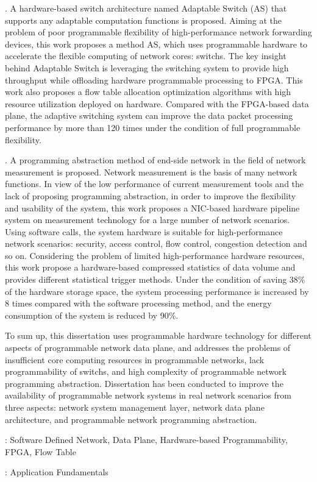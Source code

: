 . A hardware-based switch architecture named Adaptable Switch (AS) that supports any adaptable computation functions is proposed.
Aiming at the problem of poor programmable flexibility of high-performance network forwarding devices, this work proposes a method AS, which uses programmable hardware to accelerate the flexible computing of network cores: switchs.
The key insight behind Adaptable Switch is leveraging the switching system to provide high throughput while offloading hardware programmable processing to FPGA. 
This work also proposes a flow table allocation optimization algorithms with high resource utilization deployed on hardware.
Compared with the FPGA-based data plane, the adaptive switching system can improve the data packet processing performance by more than 120 times under the condition of full programmable flexibility.\newline

. A programming abstraction method of end-side network in the field of network measurement is proposed.
Network measurement is the basis of many network functions. In view of the low performance of current measurement tools and the lack of proposing programming abstraction, in order to improve the flexibility and usability of the system, this work proposes a NIC-based hardware pipeline system on measurement technology for a large number of network scenarios.
Using software calls, the system hardware is suitable for high-performance network scenarios: security, access control, flow control, congestion detection and so on.
Considering the problem of limited high-performance hardware resources, this work propose a hardware-based compressed statistics of data volume and provides different statistical trigger methods.
Under the condition of saving 38\% of the hardware storage space, the system processing performance is increased by 8 times compared with the software processing method, and the energy consumption of the system is reduced by 90\%.\newline

\noindent To sum up, this dissertation uses programmable hardware technology for different aspects of programmable network data plane, and addresses the problems of insufficient core computing resources in programmable networks, lack  programmability of switchs, and high complexity of programmable network programming abstraction. Dissertation has been conducted to improve the availability of programmable network systems in real network scenarios from three aspects: network system management layer, network data plane architecture, and programmable network programming abstraction.


\vspace{\baselineskip}
: Software Defined Network, Data Plane, Hardware-based Programmability, FPGA, Flow Table



\vspace{\baselineskip}
: Application Fundamentals

\clearpage
